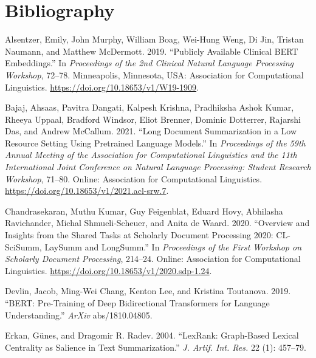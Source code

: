 \documentclass[
]{article}
\newlength{\cslhangindent}
\newlength{\cslentryspacingunit} %
\newenvironment{CSLReferences}[2] %
 {%
  \setlength{\parindent}{0pt}
  \ifodd #1
  \let\oldpar\par
  \def\par{\hangindent=\cslhangindent\oldpar}
  \fi
  \setlength{\parskip}{#2\cslentryspacingunit}
 }%
 {}
\begin{document}
\hypertarget{bibliography}{%
\section*{Bibliography}\label{bibliography}}

\hypertarget{refs}{}
\begin{CSLReferences}{1}{0}
\leavevmode{}%
Alsentzer, Emily, John Murphy, William Boag, Wei-Hung Weng, Di Jin,
Tristan Naumann, and Matthew McDermott. 2019. {``Publicly Available
Clinical {BERT} Embeddings.''} In \emph{Proceedings of the 2nd Clinical
Natural Language Processing Workshop}, 72--78. Minneapolis, Minnesota,
USA: Association for Computational Linguistics.
\url{https://doi.org/10.18653/v1/W19-1909}.

\leavevmode{}%
Bajaj, Ahsaas, Pavitra Dangati, Kalpesh Krishna, Pradhiksha Ashok Kumar,
Rheeya Uppaal, Bradford Windsor, Eliot Brenner, Dominic Dotterrer,
Rajarshi Das, and Andrew McCallum. 2021. {``Long Document Summarization
in a Low Resource Setting Using Pretrained Language Models.''} In
\emph{Proceedings of the 59th Annual Meeting of the Association for
Computational Linguistics and the 11th International Joint Conference on
Natural Language Processing: Student Research Workshop}, 71--80. Online:
Association for Computational Linguistics.
\url{https://doi.org/10.18653/v1/2021.acl-srw.7}.

\leavevmode{}%
Chandrasekaran, Muthu Kumar, Guy Feigenblat, Eduard Hovy, Abhilasha
Ravichander, Michal Shmueli-Scheuer, and Anita de Waard. 2020.
{``Overview and Insights from the Shared Tasks at Scholarly Document
Processing 2020: {CL}-{S}ci{S}umm, {L}ay{S}umm and {L}ong{S}umm.''} In
\emph{Proceedings of the First Workshop on Scholarly Document
Processing}, 214--24. Online: Association for Computational Linguistics.
\url{https://doi.org/10.18653/v1/2020.sdp-1.24}.

\leavevmode{}%
Devlin, Jacob, Ming-Wei Chang, Kenton Lee, and Kristina Toutanova. 2019.
{``BERT: Pre-Training of Deep Bidirectional Transformers for Language
Understanding.''} \emph{ArXiv} abs/1810.04805.

\leavevmode{}%
Erkan, Günes, and Dragomir R. Radev. 2004. {``LexRank: Graph-Based
Lexical Centrality as Salience in Text Summarization.''} \emph{J. Artif.
Int. Res.} 22 (1): 457--79.


\end{CSLReferences}
\end{document}
